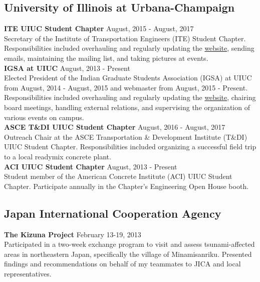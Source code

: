 \documentclass[12pt]{article}
\begin{document}
\subsection*{University of Illinois at Urbana-Champaign} 
\textbf{ITE UIUC Student Chapter} \hfill August, 2015 - August, 2017 \\
Secretary of the Institute of Transportation Engineers (ITE) Student Chapter. Responsibilities included overhauling and regularly updating the \href{https://iteuiuc.wordpress.com/}{website}, sending emails, maintaining the mailing list, and taking pictures at events. \\

\textbf{IGSA at UIUC} \hfill August, 2013 - Present \\
Elected President of the Indian Graduate Students Association (IGSA) at UIUC from August, 2014 - August, 2015 and webmaster from August, 2015 - Present. Responsibilities included overhauling and regularly updating the \href{http://igsauiuc.com/?i=1}{website}, chairing board meetings, handling external relations, and supervising the organization of various events on campus. \\

\textbf{ASCE T\&DI UIUC Student Chapter} \hfill August, 2016 - August, 2017 \\
Outreach Chair at the ASCE Transportation \& Development Institute (T\&DI) UIUC Student Chapter. Responsibilities included organizing a successful field trip to a local readymix concrete plant. \\

\textbf{ACI UIUC Student Chapter} \hfill August, 2013 - Present \\
Student member of the American Concrete Institute (ACI) UIUC Student Chapter. Participate annually in the Chapter's Engineering Open House booth. \\

\subsection*{Japan International Cooperation Agency}
\textbf{The Kizuna Project} \hfill February 13-19, 2013\\
Participated in a two-week exchange program to visit and assess tsunami-affected areas in northeastern Japan, specifically the village of Minamisanriku. Presented findings and recommendations on behalf of my teammates to JICA and local representatives. \\
\end{document}
